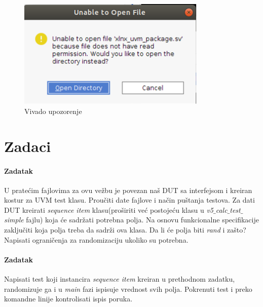 \begin{figure}[h!]
  \centering
  \includegraphics[width=90mm, scale=0.5]{img/v5_vivado_uvm_warning.png}
  \caption{Vivado upozorenje}
  \label{fig:v5_vivado_uvm_warning}
\end{figure}

\section{Zadaci}

\paragraph{Zadatak}

U pratećim fajlovima za ovu vežbu je povezan naš DUT sa interfejsom i kreiran
kostur za UVM test klasu. Proučiti date fajlove i način puštanja testova.
Za dati DUT kreirati \emph{sequence item} klasu(proširiti već postojeću klasu u
\emph{v5\(\_\)calc\(\_\)test\(\_\)simple} fajlu) koja će sadržati potrebna
polja. Na osnovu funkcionalne specifikacije zaključiti koja polja treba da
sadrži ova klasa. Da li će polja biti \emph{rand} i zašto? Napisati ograničenja
za randomizaciju ukoliko su potrebna.

\paragraph{Zadatak}

Napisati test koji instancira \emph{sequence item} kreiran u prethodnom zadatku,
randomizuje ga i u \emph{main} fazi ispisuje vrednost svih polja.
Pokrenuti test i preko komandne linije kontrolisati ispis poruka.


